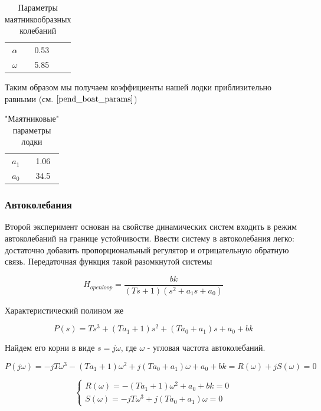 \documentclass[12pt,a4paper]{article}
\begin{document}
\begin{table}[h]
	\caption{Параметры маятникообразных колебаний}
	\label{boat_pend_params}
	\begin{center}
		\begin{tabular}{ccc}
			$\alpha$ &  0.53 \\
			$\omega$ &  5.85 \\
		\end{tabular}
	\end{center}
\end{table}

Таким образом мы получаем коэффициенты нашей лодки приблизительно равными  (см. $\ref{pend_boat_params}$)

\begin{table}[h]
	\caption{"Маятниковые" параметры лодки}
	\label{pend_boat_params}
	\begin{center}
		\begin{tabular}{cc}
			$a_1$ &  1.06 \\
			$a_0$ &  34.5 \\
		\end{tabular}
	\end{center}
\end{table}


\subsubsection{Автоколебания}

Второй эксперимент основан на свойстве динамических систем входить в режим автоколебаний на границе устойчивости. Ввести систему в автоколебания легко: достаточно добавить пропорциональный регулятор и отрицательную обратную связь. Передаточная функция такой разомкнутой системы

$$ H_{openloop} = \frac{bk}{(Ts+1)(s^2+a_1s+a_0)} $$

Характеристический полином же

$$ P(s) = Ts^3 + (Ta_1+1)s^2 + (Ta_0+a_1)s + a_0 + bk $$

Найдем его корни в виде $s=j\omega$, где $\omega$ - угловая частота автоколебаний.

$$ P(j\omega) = -jT\omega^3 - (Ta_1+1)\omega^2 + j(Ta_0+a_1)\omega + a_0 + bk  = R(\omega) + jS(\omega) = 0$$

\begin{equation*}
	\begin{cases}
		R(\omega) = - (Ta_1+1)\omega^2 + a_0 + bk = 0
		\\
		S(\omega) = -jT\omega^3 + j(Ta_0+a_1)\omega = 0
	\end{cases}
\end{equation*}
\end{document}
